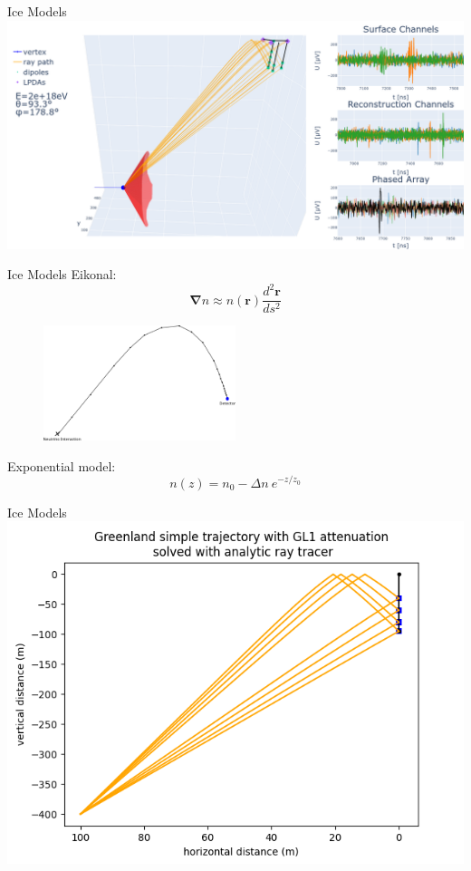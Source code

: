 \documentclass{beamer}
\begin{document}
\begin{frame}{Ice Models}
  \centering
  \includegraphics[width=\textwidth]{figures/mechanism.png}
\end{frame}
\begin{frame}{Ice Models}
Eikonal:
  \begin{equation}
    \mathbf{\nabla} n \approx n(\mathbf{r})\frac{d^2\mathbf{r}}{ds^2}
  \end{equation}
\begin{figure}
\centering
\includegraphics[width=0.5\textwidth]{figures/ExplanationRadiopropa.png}
\end{figure}
Exponential model:
  \begin{equation}
    n(z) = n_0 - \Delta n \ e^{-z/z_0}
  \end{equation}
\end{frame}
\begin{frame}{Ice Models}
  \centering
  \includegraphics[width=\textwidth]{figures/detector-illustration.png}
\end{frame}
\end{document}
